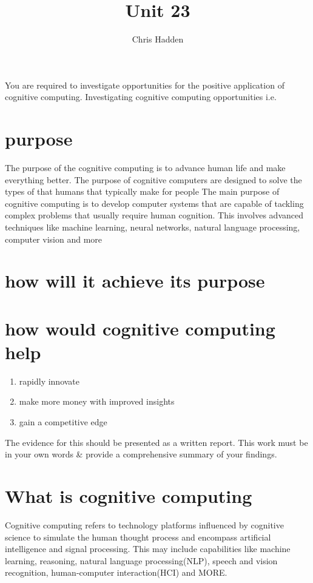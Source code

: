 \documentclass{article}
\title{Unit 23}
\author{Chris Hadden}
\date{}
\begin{document}
\maketitle

You are required to investigate opportunities for the positive application of cognitive computing.
Investigating cognitive computing opportunities i.e.

\section{purpose}
The purpose of the cognitive computing is to advance human life and make everything better. 
The purpose of cognitive computers are designed to solve the types of that humans that typically make for people
The main purpose of cognitive computing is to develop computer systems that are capable of tackling complex problems that usually require human cognition. This involves advanced techniques like machine learning, neural networks, natural language processing, computer vision and more


\section{how will it achieve its purpose}

\section{how would cognitive computing help}
\begin{enumerate}
    \item rapidly innovate
    \item make more money with improved insights 
    \item gain a competitive edge
\end{enumerate}



The evidence for this should be presented as a written report.
This work must be in your own words & provide a comprehensive summary of your findings.

\maketitle

\section{What is cognitive computing}
Cognitive computing refers to technology platforms influenced by cognitive science to simulate the human thought process and encompass artificial intelligence and signal processing. This may include capabilities like machine learning, reasoning, natural language processing(NLP), speech and vision recognition, human-computer interaction(HCI) and MORE.
\end{document}

